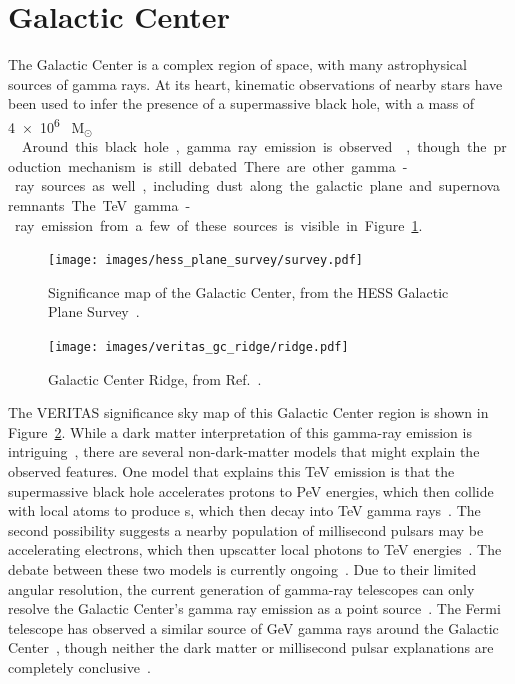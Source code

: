 \FloatBarrier

\section{Galactic Center}\label{sec:gc}
  
  The Galactic Center is a complex region of space, with many astrophysical sources of gamma rays.
  At its heart, kinematic observations of nearby stars have been used to infer the presence of a supermassive black hole, with a mass of \SI{4e6}{ M${{}_\odot}$ }~\cite{sgra_massdist}.
  Around this black hole, gamma ray emission is observed~\cite{gc_pointsrc_hess,gc_pointsource_hess2,gc_veritas_pointsource,gc_magic_pointsource}, though the production mechanism is still debated.
  There are other gamma-ray sources as well, including dust along the galactic plane and supernova remnants.
  The TeV gamma-ray emission from a few of these sources is visible in Figure~\ref{fig:hess_plane}.
  
  \begin{figure}[!t]
    \centering
    \texttt{[image: images/hess\_plane\_survey/survey.pdf]}
    \caption[HESS GC Survey]{
      Significance map of the Galactic Center, from the HESS Galactic Plane Survey~\cite{hess_gc_plane}.
      \CaptionBlankLine
    }
    \label{fig:hess_plane}
  \end{figure}
  
  \begin{figure}[!b]
    \centering
    \texttt{[image: images/veritas\_gc\_ridge/ridge.pdf]}
    \caption[VERITAS View of the Galactic Center Ridge]{
      Galactic Center Ridge, from Ref.~\cite{VeritasGCRidge2015}.
      \CaptionBlankLine
    }
    \label{fig:veritas_gc_ridge}
  \end{figure}

  The VERITAS significance sky map of this Galactic Center region is shown in Figure~\ref{fig:veritas_gc_ridge}.
  While a dark matter interpretation of this gamma-ray emission is intriguing~\cite{gc_pnt_is_dm1,gc_pnt_is_dm2}, there are several non-dark-matter models that might explain the observed features.
  One model that explains this TeV emission is that the supermassive black hole accelerates protons to PeV energies, which then collide with local atoms to produce \Ppizero{}s, which then decay into TeV gamma rays~\cite{gc_pevatron}.
  The second possibility suggests a nearby population of millisecond pulsars may be accelerating electrons, which then upscatter local photons to TeV energies~\cite{gc_pulsars,gc_pnt_is_not_dm2,gc_pnt_is_not_dm3}.
  The debate between these two models is currently ongoing~\cite{gc_pev_or_pwn}.
  Due to their limited angular resolution, the current generation of gamma-ray telescopes can only resolve the Galactic Center's gamma ray emission as a point source~\cite{VeritasGCRidge2015,gc_pointsrc_hess}.
  The Fermi telescope has observed a similar source of GeV gamma rays around the Galactic Center~\cite{gc_fermi_dm}, though neither the dark matter or millisecond pulsar explanations are completely conclusive~\cite{fermi_gc_pulsar_vs_dm,hoopergc}.
  
